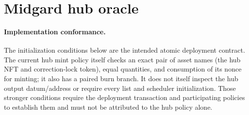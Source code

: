 \documentclass[../midgard.tex]{subfiles}
\begin{document}
\section{Midgard hub oracle}
\label{h:midgard-hub-oracle}

\paragraph{Implementation conformance.} The initialization conditions below are the intended atomic deployment contract. The current hub mint policy itself checks an exact pair of asset names (the hub NFT and correction-lock token), equal quantities, and consumption of its nonce for minting; it also has a paired burn branch. It does not itself inspect the hub output datum/address or require every list and scheduler initialization. Those stronger conditions require the deployment transaction and participating policies to establish them and must not be attributed to the hub policy alone.
\end{document}
